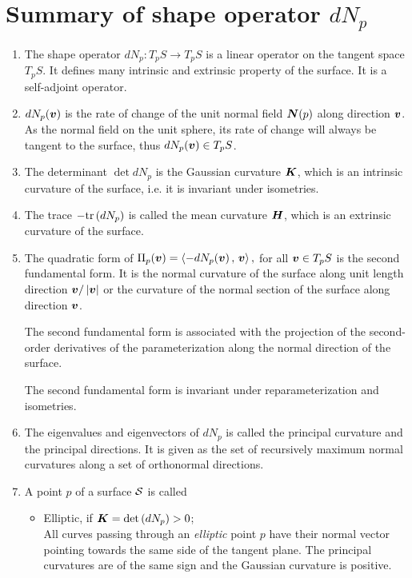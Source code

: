 \documentclass[11pt]{article}
\begin{document}
\section{Summary of shape operator $dN_{p}$}
\begin{enumerate}
\item The shape operator $dN_{p}: T_{p}S \rightarrow T_{p}S$ is a linear operator on the tangent space $T_{p}S$. It defines many intrinsic and extrinsic property of the surface. It is a self-adjoint operator. 

\item $dN_{p}(\boldsymbol{v})$ is the rate of change of the unit normal field $\boldsymbol{N}(p)$ along direction $\boldsymbol{v}$. As the normal field on the unit sphere, its rate of change will always be tangent to the surface, thus $dN_{p}(\boldsymbol{v}) \in T_{p}S$.

\item The determinant $\det{dN_{p}}$  is the Gaussian curvature $\boldsymbol{K}$, which is an intrinsic curvature of the surface, i.e. it is invariant under isometries. 

\item The trace $-\text{tr}\left(dN_{p}\right)$ is called the mean curvature $\boldsymbol{H}$, which is an extrinsic curvature of the surface. 

\item The quadratic form of $\Pi_{p}(\boldsymbol{v}) = \left\langle -dN_{p}(\boldsymbol{v})\,,\, \boldsymbol{v} \right\rangle,$ for all $\boldsymbol{v}\in T_{p}S$ is the second fundamental form. It is the normal curvature of the surface along unit length direction $\boldsymbol{v}/\left\lvert \boldsymbol{v} \right\rvert$ or the curvature of the normal section of the surface along direction $\boldsymbol{v}$. 

The second fundamental form is associated with the projection of the second-order derivatives of the parameterization along the normal direction of the surface. 

The second fundamental form is invariant under reparameterization and isometries. 
 
\item The eigenvalues and eigenvectors of $dN_{p}$ is called the principal curvature and the principal directions. It is given as the set of recursively maximum normal curvatures along a set of orthonormal directions.  

\item A point $p$ of a surface ${\mathcal S}$ is called
\begin{itemize}
\item Elliptic, if $\boldsymbol{K}= \det\left(dN_{p}\right) >0$; \\
All curves passing through an \emph{elliptic} point $p$ have their normal vector pointing towards the same side of the tangent plane. The principal curvatures are of the same sign and the Gaussian curvature is positive. 


\end{itemize}
\end{enumerate}
\end{document}
